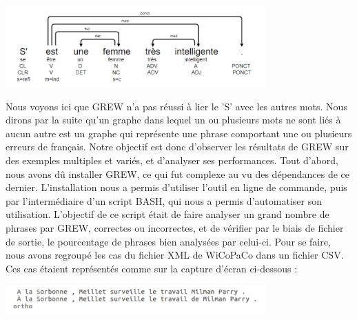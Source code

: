 \documentclass[11pt]{article}
\begin{document}
\begin{center}
\includegraphics[width=10cm]{imgGrew.png} %
\end{center}

Nous voyons ici que GREW n'a pas r\'{e}ussi \`{a} lier le 'S' avec les autres mots. Nous dirons par la suite qu'un graphe dans lequel un ou plusieurs mots ne sont li\'{e}s \`{a} aucun autre est un graphe qui repr\'{e}sente une phrase comportant une ou plusieurs erreurs de fran\c{c}ais. Notre objectif est donc d'observer  les r\'{e}sultats de GREW sur des exemples multiples et vari\'{e}s, et d'analyser ses performances.
\newline
\newline
Tout d'abord, nous avons d\^{u} installer GREW, ce qui fut complexe au vu des d\'{e}pendances de ce dernier. L'installation nous a permis d'utiliser l'outil en ligne de commande, puis par l'interm\'{e}diaire d'un script BASH, qui nous a permis d'automatiser son utilisation. L'objectif de ce script \'{e}tait de faire analyser un grand nombre de phrases par GREW, correctes ou incorrectes, et de v\'{e}rifier par le biais de fichier de sortie, le pourcentage de phrases bien analys\'{e}es par celui-ci. Pour se faire, nous avons regroup\'{e} les cas du fichier XML de WiCoPaCo dans un fichier CSV. Ces cas \'{e}taient repr\'{e}sent\'{e}s comme sur la capture d'\'{e}cran ci-dessous :

\begin{center}
\includegraphics[width=10cm]{exemple1.png} %
\end{center}
\end{document}
